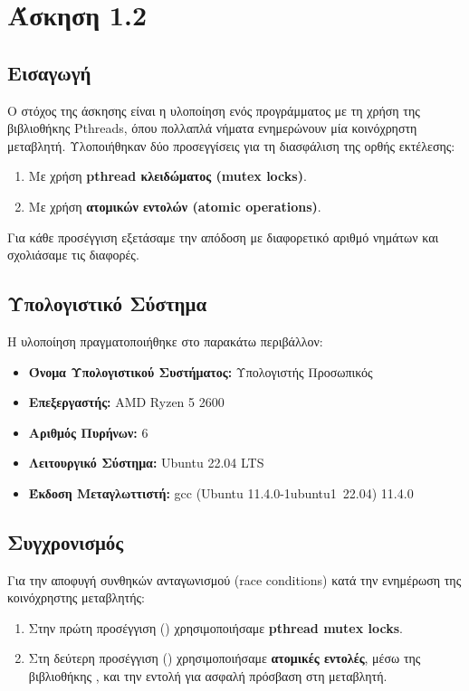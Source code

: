 \documentclass{article}
\begin{document}
\section*{Άσκηση 1.2}
\subsection*{Εισαγωγή}
Ο στόχος της άσκησης είναι η υλοποίηση ενός προγράμματος με τη χρήση της βιβλιοθήκης Pthreads, όπου πολλαπλά νήματα ενημερώνουν μία κοινόχρηστη μεταβλητή. Υλοποιήθηκαν δύο προσεγγίσεις για τη διασφάλιση της ορθής εκτέλεσης:
\begin{enumerate}
    \item Με χρήση \textbf{pthread κλειδώματος (mutex locks)}.
    \item Με χρήση \textbf{ατομικών εντολών (atomic operations)}.
\end{enumerate}
Για κάθε προσέγγιση εξετάσαμε την απόδοση με διαφορετικό αριθμό νημάτων και σχολιάσαμε τις διαφορές.
\subsection*{Υπολογιστικό Σύστημα}
Η υλοποίηση πραγματοποιήθηκε στο παρακάτω περιβάλλον: 
\begin{itemize} 
    \item \textbf{Όνομα Υπολογιστικού Συστήματος:} Υπολογιστής Προσωπικός 
    \item \textbf{Επεξεργαστής:} AMD Ryzen 5 2600 
    \item \textbf{Αριθμός Πυρήνων:} 6 
    \item \textbf{Λειτουργικό Σύστημα:} Ubuntu 22.04 LTS 
    \item \textbf{Έκδοση Μεταγλωττιστή:} gcc (Ubuntu 11.4.0-1ubuntu1~22.04) 11.4.0 
\end{itemize}
\subsection*{Συγχρονισμός}
Για την αποφυγή συνθηκών ανταγωνισμού (race conditions) κατά την ενημέρωση της κοινόχρηστης μεταβλητής:
\begin{enumerate}
    \item Στην πρώτη προσέγγιση () χρησιμοποιήσαμε \textbf{pthread mutex locks}.
    \item Στη δεύτερη προσέγγιση () χρησιμοποιήσαμε \textbf{ατομικές εντολές}, μέσω της βιβλιοθήκης , και την εντολή  για ασφαλή πρόσβαση στη μεταβλητή.
\end{enumerate}
\end{document}
